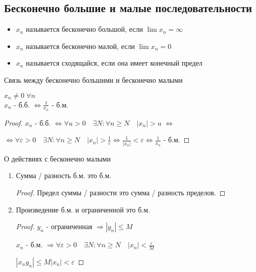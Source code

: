 \subsection{Бесконечно большие и малые последовательности}
    \begin{itemize}
        \item $x_n$ называется бесконечно большой, если $\lim x_n = \infty$
        \item $x_n$ называется бесконечно малой, если $\lim x_n = 0$
        \item $x_n$ называется сходящайся, если она имеет конечный предел
    \end{itemize}
    \vspace{0.7cm}
    \begin{theorem-non} Связь между бесконечно большими и бесконечно малыми\end{theorem-non}
    $x_n \neq 0\; \forall n$ \\
    $x_n$ - б.б. $\Leftrightarrow \frac{1}{x_n}$ - б.м.
    \begin{proof}
        $x_n$ - б.б. $\Leftrightarrow \forall u > 0\quad \exists N : \forall n \geqslant N\quad |x_n| > u$ $\Leftrightarrow$ 
        
        $\Leftrightarrow \forall \varepsilon > 0\quad \exists N : \forall n \geqslant N\quad |x_n| > \frac{1}{\varepsilon} \Leftrightarrow \frac{1}{|x_n|} < \varepsilon \Leftrightarrow \frac{1}{x_n}$ - б.м.
    \end{proof}
    \begin{theorem-non} О действиях с бесконечно малыми \end{theorem-non}
    \begin{enumerate}
        \item Сумма / разность б.м. это б.м.
        \begin{proof}
            Предел суммы / разности это сумма / разность пределов. 
        \end{proof}
        \item Произведение б.м. и ограниченной это б.м.
        \begin{proof}
            $y_n$ - ограниченная $\Rightarrow |y_n| \leqslant M$ 
            
            $x_n$ - б.м. $\Rightarrow \forall \varepsilon > 0\quad \exists N : \forall n \geqslant N\quad |x_n| < \frac{\varepsilon}{M}$
            
            $|x_ny_n| \leqslant M|x_n| < \varepsilon$
        \end{proof}
    \end{enumerate}